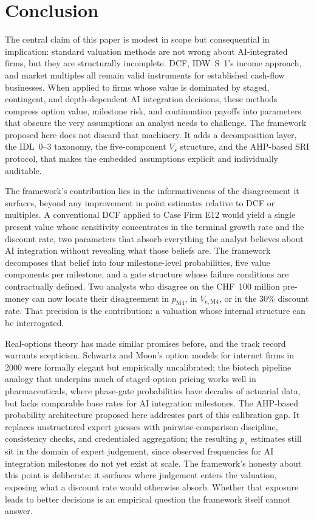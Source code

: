 \documentclass[oneside,10pt]{swissi}
\begin{document}
\section{Conclusion}

The central claim of this paper is modest in scope but consequential in implication: standard valuation methods are not wrong about AI-integrated firms, but they are structurally incomplete. DCF, IDW~S~1's income approach, and market multiples all remain valid instruments for established cash-flow businesses. When applied to firms whose value is dominated by staged, contingent, and depth-dependent AI integration decisions, these methods compress option value, milestone risk, and continuation payoffs into parameters that obscure the very assumptions an analyst needs to challenge. The framework proposed here does not discard that machinery. It adds a decomposition layer, the IDL~0--3 taxonomy, the five-component $V_s$ structure, and the AHP-based SRI protocol, that makes the embedded assumptions explicit and individually auditable.

The framework's contribution lies in the informativeness of the disagreement it surfaces, beyond any improvement in point estimates relative to DCF or multiples. A conventional DCF applied to Case Firm E12 would yield a single present value whose sensitivity concentrates in the terminal growth rate and the discount rate, two parameters that absorb everything the analyst believes about AI integration without revealing what those beliefs are. The framework decomposes that belief into four milestone-level probabilities, five value components per milestone, and a gate structure whose failure conditions are contractually defined. Two analysts who disagree on the CHF~100 million pre-money can now locate their disagreement in $p_{\mathrm{M4}}$, in $V_{\mathrm{c},\mathrm{M4}}$, or in the 30\% discount rate. That precision is the contribution: a valuation whose internal structure can be interrogated.

Real-options theory has made similar promises before, and the track record warrants scepticism. Schwartz and Moon's option models for internet firms in 2000 were formally elegant but empirically uncalibrated; the biotech pipeline analogy that underpins much of staged-option pricing works well in pharmaceuticals, where phase-gate probabilities have decades of actuarial data, but lacks comparable base rates for AI integration milestones. The AHP-based probability architecture proposed here addresses part of this calibration gap. It replaces unstructured expert guesses with pairwise-comparison discipline, consistency checks, and credentialed aggregation; the resulting $p_s$ estimates still sit in the domain of expert judgement, since observed frequencies for AI integration milestones do not yet exist at scale. The framework's honesty about this point is deliberate: it surfaces where judgement enters the valuation, exposing what a discount rate would otherwise absorb. Whether that exposure leads to better decisions is an empirical question the framework itself cannot answer.
\end{document}
